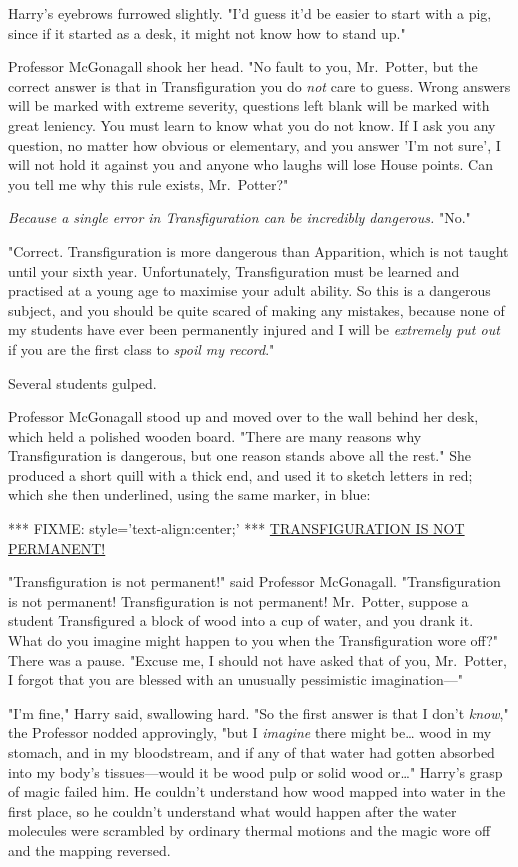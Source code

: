 Harry's eyebrows furrowed slightly. "I'd guess it'd be easier to start with a 
pig, since if it started as a desk, it might not know how to stand up."

Professor McGonagall shook her head. "No fault to you, Mr.~Potter, but the 
correct answer is that in Transfiguration you do \emph{not} care to guess. 
Wrong answers will be marked with extreme severity, questions left blank will 
be marked with great leniency. You must learn to know what you do not know. If 
I ask you any question, no matter how obvious or elementary, and you answer 
'I'm not sure', I will not hold it against you and anyone who laughs will lose 
House points. Can you tell me why this rule exists, Mr.~Potter?"

\emph{Because a single error in Transfiguration can be incredibly dangerous.} 
"No."

"Correct. Transfiguration is more dangerous than Apparition, which is not 
taught until your sixth year. Unfortunately, Transfiguration must be learned 
and practised at a young age to maximise your adult ability. So this is a 
dangerous subject, and you should be quite scared of making any mistakes, 
because none of my students have ever been permanently injured and I will be 
\emph{extremely put out} if you are the first class to\emph{ spoil my record}."

Several students gulped.

Professor McGonagall stood up and moved over to the wall behind her desk, which 
held a polished wooden board. "There are many reasons why Transfiguration is 
dangerous, but one reason stands above all the rest." She produced a short 
quill with a thick end, and used it to sketch letters in red; which she then 
underlined, using the same marker, in blue:

*** FIXME: style='text-align:center;' ***
\underline{TRANSFIGURATION IS NOT PERMANENT!}

"Transfiguration is not permanent!" said Professor McGonagall. "Transfiguration 
is not permanent! Transfiguration is not permanent! Mr.~Potter, suppose a 
student Transfigured a block of wood into a cup of water, and you drank it. 
What do you imagine might happen to you when the Transfiguration wore off?" 
There was a pause. "Excuse me, I should not have asked that of you, Mr.~Potter, 
I forgot that you are blessed with an unusually pessimistic imagination---"

"I'm fine," Harry said, swallowing hard. "So the first answer is that I don't 
\emph{know}," the Professor nodded approvingly, "but I \emph{imagine} there 
might be{\ldots} wood in my stomach, and in my bloodstream, and if any of that 
water had gotten absorbed into my body's tissues---would it be wood pulp or 
solid wood or{\ldots}" Harry's grasp of magic failed him. He couldn't 
understand how wood mapped into water in the first place, so he couldn't 
understand what would happen after the water molecules were scrambled by 
ordinary thermal motions and the magic wore off and the mapping reversed.

